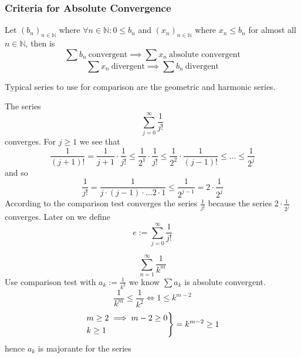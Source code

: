 \subsubsection{Criteria for Absolute Convergence}
\begin{proposition}\label{pro:comparison_test}
   Let \((b_n)_{n \in \mathbb{N}}\) where \(\forall n \in \mathbb{N}: 0 \leq b_n\) and \((x_n)_{n \in \mathbb{N}}\) where \(x_n \leq b_n\) for almost all \(n \in \mathbb{N}\), then is
   \[\sum b_n~\text{convergent} \implies \sum x_n~\text{absolute convergent}\]
   \[\sum x_n~\text{divergent} \implies \sum b_n~\text{divergent}\]
\end{proposition}
\begin{remark}
   Typical series to use for comparison are the geometric and harmonic series.
\end{remark}
\begin{example}
   The series
   \[\sum_{j=0}^\infty \frac{1}{j!}\]
   converges.
   For \(j \geq 1\) we see that
   \[\frac{1}{(j + 1)!} = \frac{1}{j + 1} \cdot \frac{1}{j!} \leq \frac{1}{2^1} \cdot \frac{1}{j!} \leq \frac{1}{2^2} \cdot \frac{1}{(j - 1)!} \leq \ldots \leq \frac{1}{2^j}\]
   and so
   \[\frac{1}{j!} = \frac{1}{j \cdot (j - 1) \cdot \ldots 2 \cdot 1} \leq \frac{1}{2^{j-1}} = 2 \cdot \frac{1}{2^j}\]
   According to the comparison test converges the series \(\frac{1}{j!}\) because the series \(2 \cdot \frac{1}{2^j}\) converges.
   Later on we define
   \[e := \sum_{j=0}^\infty \frac{1}{j!}\]
\end{example}
\begin{example}
   \[\sum_{n=1}^\infty \frac{1}{k^m}\]
   Use comparison test with \(a_k := \frac{1}{k^2}\) we know \(\sum a_k\) is absolute convergent.
   \[\frac{1}{k^m} \leq \frac{1}{k^2} \iff 1 \leq k^{m-2}\]
   \[\begin{drcases}m \geq 2 \implies m-2 \geq 0\\k \geq 1\end{drcases} = k^{m-2} \geq 1\]
   hence \(a_k\) is majorante for the series 
\end{example}


